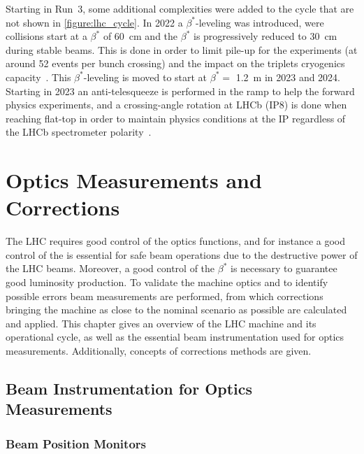Starting in Run~\num{3}, some additional complexities were added to the cycle that are not shown in \cref{figure:lhc_cycle}.
In \num{2022} a \(\beta^{\ast}\)-leveling was introduced, were collisions start at a \(\beta^{\ast}\) of \qty{60}{\centi\meter} and the \(\beta^{\ast}\) is progressively reduced to \qty{30}{\centi\meter} during stable beams.
This is done in order to limit pile-up for the experiments (at around \num{52} events per bunch crossing) and the impact on the triplets cryogenics capacity~\cite{CERN:Fartoukh:LHC_Config_Run3, CERN:Ferlin:Cryogenics}.
This \(\beta^{\ast}\)-leveling is moved to start at \(\beta^{\ast} =\) \qty{1.2}{\meter} in \num{2023} and \num{2024}.
Starting in \num{2023} an anti-telesqueeze is performed in the ramp to help the forward physics experiments, and a crossing-angle rotation at LHCb (IP\num{8}) is done when reaching flat-top in order to maintain physics conditions at the IP regardless of the LHCb spectrometer polarity~\cite{CERN:Fartoukh:LHC_Config_Run3}.


\section{Optics Measurements and Corrections}
\label{section:optics_measurements_and_corrections}

The LHC requires good control of the optics functions, and for instance a good control of the \betafunctions is essential for safe beam operations due to the destructive power of the LHC beams.
Moreover, a good control of the \(\beta^{\ast}\) is necessary to guarantee good luminosity production.
To validate the machine optics and to identify possible errors beam measurements are performed, from which corrections bringing the machine as close to the nominal scenario as possible are calculated and applied. 
This chapter gives an overview of the LHC machine and its operational cycle, as well as the essential beam instrumentation used for optics measurements.
Additionally, concepts of corrections methods are given.

\subsection{Beam Instrumentation for Optics Measurements}

\subsubsection{Beam Position Monitors}

